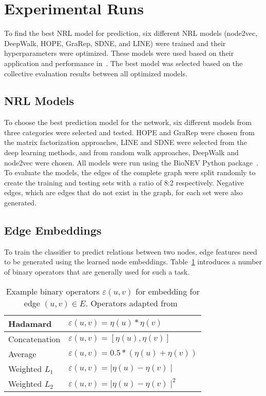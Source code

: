 \section{Experimental Runs}

To find the best \ac{NRL} model for prediction, six different \ac{NRL} models (node2vec, DeepWalk, \ac{HOPE}, \ac{GraRep}, \ac{SDNE}, and \ac{LINE}) were trained and their hyperparameters were optimized.
These models were used based on their application and performance in~\cite{yue_graph_2019}.
The best model was selected based on the collective evaluation results between all optimized models.

\subsection{NRL Models}

To choose the best prediction model for the network, six different models from three categories were selected and tested.
\ac{HOPE} and \ac{GraRep} were chosen from the matrix factorization approaches, \ac{LINE} and \ac{SDNE} were selected from the deep learning methods, and from random walk approaches, DeepWalk and node2vec were chosen.
All models were run using the BioNEV Python package~\cite{yue_graph_2019}.
To evaluate the models, the edges of the complete graph were split randomly to create the training and testing sets with a ratio of 8:2 respectively.
Negative edges, which are edges that do not exist in the graph, for each set were also generated.

\subsection{Edge Embeddings}

To train the classifier to predict relations between two nodes, edge features need to be generated using the learned node embeddings.
Table~\ref{tab:operators} introduces a number of binary operators that are generally used for such a task.

\begin{table}[h!]
    \centering
    \begin{tabular}{ |l|l| }
        \hline
        Hadamard & $\varepsilon(u,v)= \eta(u)*\eta(v)$ \\
        \hline
        Concatenation & $\varepsilon(u,v)=[\eta(u), \eta(v)]$ \\
        \hline
        Average & $\varepsilon(u,v)=0.5*(\eta(u)+\eta(v))$ \\
        \hline
        Weighted $L_{1}$ & $\varepsilon(u,v)=\mid\eta(u)-\eta(v)\mid$ \\
        \hline
        Weighted $L_{2}$ & $\varepsilon(u,v)=\mid\eta(u)-\eta(v)\mid^2$ \\
        \hline
    \end{tabular}
    \caption[Example binary operators $\varepsilon(u,v)$ for embedding for edge $(u,v) \in E$]{Example binary operators $\varepsilon(u,v)$ for embedding for edge $(u,v) \in E$. Operators adapted from~\cite{grover_node2vec:_2016}}
    \label{tab:operators}
\end{table}


